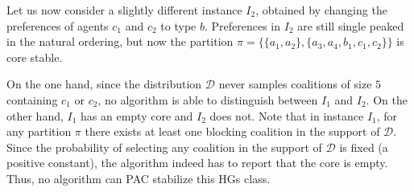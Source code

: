 \documentclass[letterpaper]{article} %
\newcommand{\distribution}{\mathcal{D}}
\newcommand{\set}[1]{\{#1\}}
\begin{document}
Let us now consider a slightly different instance $I_2$, obtained by changing the preferences of agents $c_1$ and $c_2$ to type $b$. Preferences in $I_2$ are still single peaked in the natural ordering, but now the partition $\pi = \set{\set{a_1,a_2}, \set{a_3, a_4, b_1, c_1, c_2}}$ is core stable.

On the one hand, since the distribution $\distribution$ never samples coalitions of size $5$ containing $c_1$ or $c_2$, no algorithm is able to distinguish between $I_1$ and $I_2$. On the other hand, $I_1$ has an empty core and $I_2$ does not. Note that in instance $I_1$, for any partition $\pi$ there exists at least one blocking coalition in the support of $\distribution$. Since the probability of selecting any coalition in the support of $\distribution$ is fixed (a positive constant), the algorithm indeed has to report that the core is empty. Thus, no algorithm can PAC stabilize this HGs class.
\end{document}
